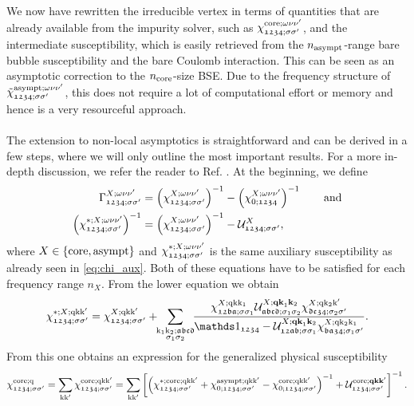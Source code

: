 \documentclass[../../main.tex]{subfiles}
\begin{document}
We now have rewritten the irreducible vertex in terms of quantities that are already available from the impurity solver, such as $\chi_{\mathfrak{1234};\ss'}^{\core;\omega\nu\nu'}$, and the intermediate susceptibility, which is easily retrieved from the $n_{\asympt}$-range bare bubble susceptibility and the bare Coulomb interaction. This can be seen as an asymptotic correction to the $n_{\core}$-size BSE. Due to the frequency structure of $\tilde\chi_{\mathfrak{1234};\ss'}^{\asympt;\omega\nu\nu'}$, this does not require a lot of computational effort or memory and hence is a very resourceful approach.
\\\\
The extension to non-local asymptotics is straightforward and can be derived in a few steps, where we will only outline the most important results. For a more in-depth discussion, we refer the reader to Ref. \cite{motoharu asympt}. At the beginning, we define
\begin{align}
	\Gamma_{\mathfrak{1234};\ss'}^{X;\omega\nu\nu'}&=\left (\chi_{\mathfrak{1234};\ss'}^{X;\omega\nu\nu'}\right )^{-1}-\left (\chi_{0;\mathfrak{1234}}^{X;\omega\nu\nu'}\right )^{-1} \qqand\\
	\left (\chi_{\mathfrak{1234};\ss'}^{*;X;\omega\nu\nu'}\right )^{-1}&=\left (\chi_{\mathfrak{1234};\ss'}^{X;\omega\nu\nu'}\right )^{-1}-\mathcal{U}_{\mathfrak{1234};\ss'}^{X},
\end{align}
where $X\in\{\core,\asympt\}$ and $\chi_{\mathfrak{1234};\ss'}^{*;X;\omega\nu\nu'}$ is the same auxiliary susceptibility as already seen in \eqref{eq:chi_aux}. Both of these equations have to be satisfied for each frequency range $n_{X}$. From the lower equation we obtain
\begin{align}
	\chi_{\mathfrak{1234};\ss'}^{*;X;\q\k\kp}=\chi_{\mathfrak{1234};\ss'}^{X;\q\k\kp}+\!\! \sum_{\substack{\k_1\k_2;\mathfrak{abcd}\\\sigma_1\sigma_2}}\!\! \frac{\chi_{\mathfrak{12ba};\ss_1}^{X;\q\k\k_1} \mathcal{U}^{X;\vv{qk}_1\vv{k}_2}_{\mathfrak{abcd};\sigma_1\sigma_2} \chi_{\mathfrak{dc34};\sigma_2\sigma'}^{X;\q\k_2\kp}}{\unity_{\mathfrak{1234}} - \mathcal{U}^{X;\vv{qk}_1\vv{k}_2}_{\mathfrak{12ab};\ss_1}\chi^{X;\q\k_2\k_1}_{\mathfrak{ba34};\sigma_1\sigma'}}.
\end{align}
From this one obtains an expression for the generalized physical susceptibility \cite{motoharu asympt}
\begin{align}
	\chi_{\mathfrak{1234};\ss'}^{\core;\q}=\sum_{\k\kp}\chi_{\mathfrak{1234};\ss'}^{\core;\q\k\kp}=\sum_{\k\kp}\left [\left (\chi_{\mathfrak{1234};\ss'}^{*;\core;\q\k\kp}+\chi_{0;\mathfrak{1234};\ss'}^{\asympt;\q\k\kp}-\chi_{0;\mathfrak{1234};\ss'}^{\core;\q\k\kp}\right )^{-1}+\mathcal{U}_{\mathfrak{1234};\ss'}^{\core;\vv{qkk}'}\right ]^{-1}.
\end{align}
\end{document}
